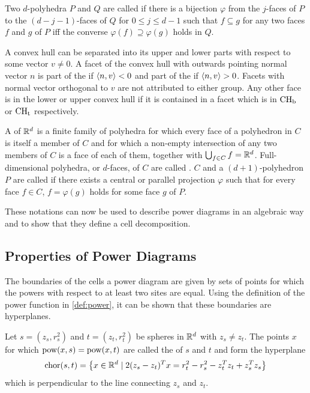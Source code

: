 Two $d$-polyhedra $P$ and $Q$ are called  if there is a bijection $\varphi$ from the $j$-faces of $P$ to the $(d-j-1)$-faces of $Q$ for $0 \leq j \leq d  -1$ such that $f \subseteq g$ for any two faces $f$ and $g$ of $P$ iff the converse $\varphi(f) \supseteq \varphi(g)$ holds in $Q$.

A convex hull can be separated into its upper and lower parts with respect to some vector $v \neq 0$.
A facet of the convex hull with outwards pointing normal vector $n$ is part of the  if $\left\langle n, v \right\rangle < 0$ and part of the  if $\left\langle n, v \right\rangle > 0$.
Facets with normal vector orthogonal to $v$ are not attributed to either group.
Any other face is in the lower or upper convex hull if it is contained in a facet which is in $\operatorname{CH_b}$ or $\operatorname{CH_t}$ respectively.

A  of $\mathbb{R}^d$ is a finite family of polyhedra for which every face of a polyhedron in $C$ is itself a member of $C$ and for which a non-empty intersection of any two members of $C$ is a face of each of them, together with $\bigcup_{f \in C} f = \mathbb{R}^d$.
Full-dimensional polyhedra, or $d$-faces, of $C$ are called .
$C$ and a $(d+1)$-polyhedron $P$ are called  if there exists a central or parallel projection $\varphi$ such that for every face $f \in C$, $f = \varphi(g)$ holds for some face $g$ of $P$.

These notations can now be used to describe power diagrams in an algebraic way and to show that they define a cell decomposition.

\subsection{Properties of Power Diagrams}
\label{sub:properties_of_power_diagrams}
The boundaries of the cells a power diagram are given by sets of points for which the powers with respect to at least two sites are equal.
Using the definition of the power function in \cref{def:power}, it can be shown that these boundaries are hyperplanes.
\begin{lemma}
    \label{lem:chordale}
    Let $s = (z_s, r^2_s)$ and $t = (z_t, r^2_t)$ be spheres in $\mathbb{R}^d$ with $z_s \neq z_t$. The points $x$ for which $\operatorname{pow}(x, s) = \operatorname{pow}(x, t)$ are called the  of $s$ and $t$ and form the hyperplane
    \begin{align}
        \operatorname{chor}(s, t) = \left\{ x \in \mathbb{R}^d \mid 2(z_s - z_t)^Tx = r_t^2 - r_s^2 - z_t^Tz_t + z_s^Tz_s \right\}
    \end{align}
    which is perpendicular to the line connecting $z_s$ and $z_t$.
\end{lemma}

